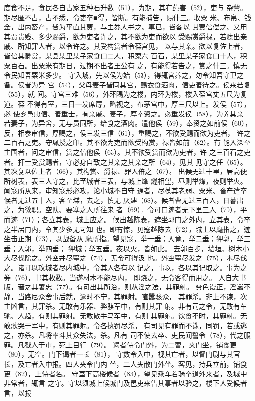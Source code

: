 \documentclass[12pt,UTF8]{ctexbook}
\begin{document}
度食不足，食民各自占家五种石升数（51），为期，其在莼害（52），吏与 
杂訾。期尽匿不占，占不悉，令吏卒■得，皆断。有能捕告，赐什三。收粟 
米、布帛、钱金，出内畜产，皆为平直其贾，与主券人书之。事已，皆各以 
其贾倍偿之。又用其贾贵贱、多少赐爵，欲为吏者许之，其不欲为吏而欲以 
受赐赏爵禄，若赎出亲戚、所知罪人者，以令许之。其受构赏者令葆宫见， 
以与其亲。欲以复佐上者，皆倍其爵赏，某县某里某子家食口二人，积粟六 
百石，某里某子家食口十人，积粟百石。出粟米有期日，过期不出者王公有 
之，有能得若告之，赏之什三。慎无令民知吾粟米多少。 
守入城，先以侯为始（53），得辄宫养之，勿令知吾守卫之备。侯者为异 
宫（54），父母妻子皆同其宫，赐衣食酒肉，信吏善待之。侯来若复（55），就 
间。守宫三难（56），外环隅为之楼，内环为楼，楼入葆宫丈五尺为复道。葆 
不得有室，三日一发席蓐，略视之，布茅宫中，厚三尺以上。发侯（57），必 
使乡邑忠信、善重士，有亲戚、妻子，厚奉资之。必重发侯（58），为养其亲 
若妻子，为异舍，无与员同所，给食之酒肉。遣他侯（59），奉资之如前侯（60）， 
反，相参审信，厚赐之，侯三发三信（61），重赐之，不欲受赐而欲为吏者， 
许之二百石之吏。守珮授之印。其不欲为吏而欲受构赏，禄皆如前（62）。有 
能入深至主国者，问之审信，赏之倍他侯（63）。其不欲受赏而欲为吏者，许 
之三百石之吏者。扞士受赏赐者，守必身自致之其亲之其亲之所（64），见其 
见守之任（65）。其次复以佐上者（66），其构赏、爵禄、罪人倍之（67）。 
出候无过十里，居高便所树表，表三人守之，比至城者三表，与城上烽 
燧相望，昼则举烽，夜则举火。闻寇所从来，审知寇形必攻，论小城不自守 
通者，尽葆其老弱、粟米、畜产遣卒候者无过五十人，客至堞，去之，慎无 
厌建（68）。候者曹无过三百人，日暮出之，为微职。空队、要塞之人所往来 
者（69），令可口迹者无下里三人（70），平而迹（71）；各立其表，城上应之。 
候出越陈表，遮坐郭门之外内，立其表，令卒之半居门内，令其少多无可知 
也。即有惊，见寇越陈去（72），城上以麾指之，迹坐击正期（73），以战备从 
麾所指。望见寇，举一垂；入竟，举二垂；狎郭，举三垂；入郭，举四垂； 
狎城；举五垂。夜以火，皆如此。 
去郭百步，墙垣、树木小大尽伐除之。外空井尽窒之（74），无令可得汲 
也。外空窒尽发之（75），木尽伐之。诸可以攻城者尽内城中，令其人各有以 
记之，事以，各以其记取之。事为之券（76），书其枚数。当遂材木不能尽内， 
即烧之，无令客得而用之。 
人自大书版，著之其署忠（77）。有司出其所治，则从淫之法，其罪射。 
务色谩正，淫嚣不静，当路尼众舍事后就，逾时不宁，其罪射。喧嚣骇众， 
其罪杀。非上不谏，次主凶言，其罪杀。无敢有乐器、弊骐军中，有则其罪 
射。非有司之令，无敢有车驰、人趋，有则其罪射。无敢散牛马军中，有则 
其罪射。饮食不时，其罪射。无敢歌哭于军中，有则其罪射。令各执罚尽杀， 
有司见有罪而不诛，同罚，若或逃之，亦杀。凡将率斗其众失法，杀。凡有 
司不使去卒、吏民闻誓令（78），代之服罪。凡戮人于市，死上目行（79）。 
谒者侍令门外，为二曹，夹门坐，铺食更（80），无空。门下谒者一长（81）， 
守数令入中，视其亡者，以督门尉与其官长，及亡者入中报。四人夹令门内 
坐，二人夹散门外坐。客见，持兵立前，铺食更（82），上侍者名。 
守室下高楼候者（83），望见乘车若骑卒道外来者，及城中非常者，辄言 
之守。守以须城上候城门及邑吏来告其事者以验之，楼下人受候者言，以报 
\end{document}
